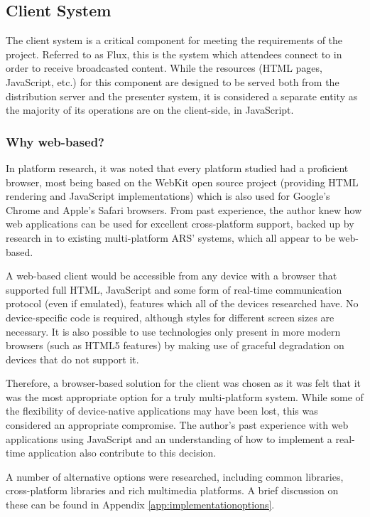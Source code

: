 \documentclass[a4papert,11pt,notitlepage]{article}
\begin{document}
\subsection{Client System}
The client system is a critical component for meeting the requirements of the project. Referred to as Flux, this is the system which attendees connect to in order to receive broadcasted content.
While the resources (HTML pages, JavaScript, etc.) for this component are designed to be served both from the distribution server and the presenter system, it is considered a separate entity as the majority of its operations are on the client-side, in JavaScript.

\subsubsection{Why web-based?}
In platform research, it was noted that every platform studied had a proficient browser, most being based on the WebKit\cite{webkit:web} open source project (providing HTML rendering and JavaScript implementations) which is also used for Google's Chrome and Apple's Safari browsers. From past experience, the author knew how web applications can be used for excellent cross-platform support, backed up by research in to existing multi-platform ARS' systems, which all appear to be web-based. 

A web-based client would be accessible from any device with a browser that supported full HTML, JavaScript and some form of real-time communication protocol (even if emulated), features which all of the devices researched have. No device-specific code is required, although styles for different screen sizes are necessary. It is also possible to use technologies only present in more modern browsers (such as HTML5 features) by making use of graceful degradation on devices that do not support it.

Therefore, a browser-based solution for the client was chosen as it was felt that it was the most appropriate option for a truly multi-platform system. While some of the flexibility of device-native applications may have been lost, this was considered an appropriate compromise. The author's past experience with web applications using JavaScript and an understanding of how to implement a real-time application also contribute to this decision.

A number of alternative options were researched, including common libraries, cross-platform libraries and rich multimedia platforms. A brief discussion on these can be found in Appendix \ref{app:implementationoptions}.
\end{document}
